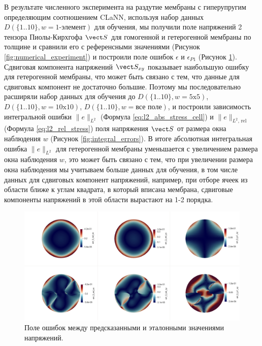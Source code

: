   В результате численного эксперимента на раздутие мембраны с гиперупругим определяющим соотношением CLaNN,
  используя набор данных $D (\{1..10\}, w=\text{1-элемент})$ для обучения, мы получили поле напряжений 2 тензора Пиолы-Кирхгофа 
  $\vect S$ для гомогенной и гетерогенной мембраны по толщине и сравнили его
  с референсными значениями (Рисунок \ref{fig:numerical_experiment}) и построили поле ошибок $\epsilon$ и $\epsilon_{P1}$ (Рисунок \ref{fig:numerical_errors}).
  Сдвиговая компонента напряжений $\vect S_{xy}$ показывает наибольшую ошибку для гетерогенной мембраны, 
  что может быть связано с тем, что данные для сдвиговых компонент не достаточно большие. Поэтому мы последовательно 
  расширяли набор данных для обучения до $D (\{1..10\}, w=\text{5x5})$, $D (\{1..10\}, w=\text{10x10})$, $D (\{1..10\}, w=\text{все поле})$, 
  и построили зависимость интегральной ошибки $\|e\|_{L^2}$ (Формула \eqref{eq:l2_abs_stress_cell}) и $\|e\|_{L^2,\,\mathrm{rel}}$ (Формула \eqref{eq:l2_rel_stress}) 
  поля напряжения $\vect S$ от размера окна наблюдения $w$ (Рисунок \ref{fig:integral_errors}). 
  В итоге абсолютная интегральная ошибка $\|e\|_{L^2}$  для гетерогенной мембраны уменьшается с увеличением размера окна наблюдения $w$, 
  это может быть связано с тем, что при увеличении размера окна наблюдения мы учитываем больше данных для обучения, в том числе данных 
  для сдвиговых компонент напряжений, например, при отборе ячеек из области ближе к углам квадрата, в который вписана мембрана, 
  сдвиговые компоненты напряжений в этой области вырастают на 1-2 порядка.
  
  
  \begin{figure}[H]
    \centering
    \includegraphics[width=1.0\textwidth]{img/Numerical/errs.png}
    \caption{Поле ошибок между предсказанными и эталонными значениями напряжений.}
    \label{fig:numerical_errors}
  \end{figure}

